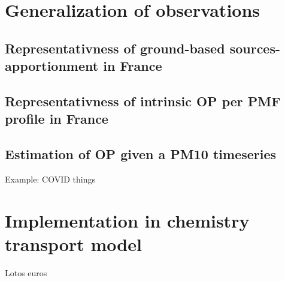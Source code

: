 
\section{Generalization of observations}%
\label{sec:generalization_of_observation}

\subsection{Representativness of ground-based sources-apportionment in France}%
\label{sub:representativness_of_ground_based_sources_apportionment_in_france}


\subsection{Representativness of intrinsic OP per PMF profile in France}%
\label{sub:representativness_of_intrinsic_op_per_pmf_profile_in_france}

\subsection{Estimation of OP given a PM10 timeseries}%
\label{sub:estimation_of_op_given_a_pm10_timeseries}

Example: COVID things

\section{Implementation in chemistry transport model}%
\label{sec:implementation_in_chemistry_transport_model}

Lotos euros

